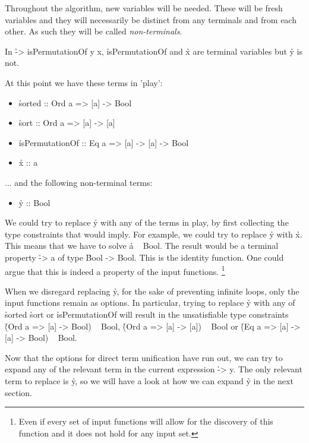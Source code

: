 \documentclass[a4paper, 11pt]{article}
\begin{document}
Throughout the algorithm, new variables will be needed.
These will be fresh variables and they will necessarily be distinct from any terminals and from each other.
As such they will be called \emph{non-terminals}.

\begin{ex}
  In \h{\x -> isPermutationOf y x}, \h{isPermutationOf} and \h{x} are terminal variables but \h{y} is not.
\end{ex}

At this point we have these terms in 'play':

\begin{itemize}
  \item \h{sorted :: Ord a => [a] -> Bool}
  \item \h{sort :: Ord a => [a] -> [a]}
  \item \h{isPermutationOf :: Eq a => [a] -> [a] -> Bool}
  \item \h{x :: a}
\end{itemize}

... and the following non-terminal terms:

\begin{itemize}
  \item \h{y :: Bool}
\end{itemize}

We could try to replace \h{y} with any of the terms in play, by first collecting the type constraints that would imply.
For example, we could try to replace \h{y} with \h{x}.
This means that we have to solve \h{a ~ Bool}.
The result would be a terminal property \h{\a -> a} of type \h{Bool -> Bool}.
This is the identity function.
One could argue that this is indeed a property of the input functions.
\footnote{Even if every set of input functions will allow for the discovery of this function and it does not hold for any input set.}

When we disregard replacing \h{y}, for the sake of preventing infinite loops, only the input functions remain as options.
In particular, trying to replace \h{y} with any of \h{sorted} \h{sort} or \h{isPermutationOf} will result in the unsatisfiable type constraints \h{(Ord a => [a] -> Bool) ~ Bool}, \h{(Ord a => [a] -> [a]) ~ Bool} or \h{(Eq a => [a] -> [a] -> Bool) ~ Bool}.

Now that the options for direct term unification have run out, we can try to expand any of the relevant term in the current expression \h{\x -> y}.
The only relevant term to replace is \h{y}, so we will have a look at how we can expand \h{y} in the next section.
\end{document}
